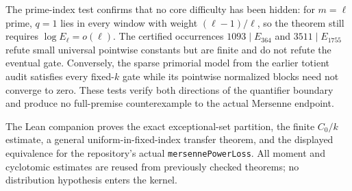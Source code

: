 The prime-index test confirms that no core difficulty has been hidden: for
$m=\ell$ prime, $q=1$ lies in every window with weight
$(\ell-1)/\ell$, so the theorem still requires $\log E_\ell=o(\ell)$.
The certified occurrences $1093\mid E_{364}$ and $3511\mid E_{1755}$
refute small universal pointwise constants but are finite and do not refute
the eventual gate.  Conversely, the sparse primorial model from the earlier
totient audit satisfies every fixed-$k$ gate while its pointwise normalized
blocks need not converge to zero.  These tests verify both directions of the
quantifier boundary and produce no full-premise counterexample to the actual
Mersenne endpoint.

The Lean companion proves the exact exceptional-set partition, the finite
$C_0/k$ estimate, a general uniform-in-fixed-index transfer theorem, and the
displayed equivalence for the repository's actual
\texttt{mersennePowerLoss}.  All moment and cyclotomic estimates are reused
from previously checked theorems; no distribution hypothesis enters the
kernel.
